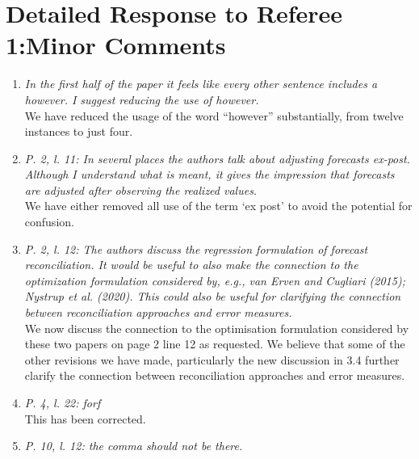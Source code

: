 \documentclass[a4paper,11pt]{article}
\begin{document}
	    \section*{Detailed Response to Referee 1:Minor Comments}
	
	    \begin{enumerate}
	
	    \item \textit{In the first half of the paper it feels like every other sentence includes a however. I suggest reducing the use of however.}\\
	
	    We have reduced the usage of the word ``however'' substantially, from twelve instances to just four.\\
	
	    \item \textit{P. 2, l. 11: In several places the authors talk about adjusting forecasts ex-post. Although I understand what is meant, it gives the impression that forecasts are adjusted after observing the realized values.}\\
	
	    We have either removed all use of the term `ex post' to avoid the potential for confusion.\\
	
	    \item \textit{P. 2, l. 12: The authors discuss the regression formulation of forecast reconciliation. It would be useful to also make the connection to the optimization formulation considered by, e.g., van Erven and Cugliari (2015); Nystrup et al. (2020). This could also be useful for clarifying the connection between reconciliation approaches and error measures.}\\
	
	    We now discuss the connection to the optimisation formulation considered by these two papers on page 2 line 12 as requested.  We believe that some of the other revisions we have made, particularly the new discussion in 3.4 further clarify the connection between reconciliation approaches and error measures.\\
	
	    \item \textit{P. 4, l. 22: forf}\\
	
	    This has been corrected.\\
	
	    \item \textit{P. 10, l. 12: the comma should not be there.}\\
	

\end{enumerate}
\end{document}
